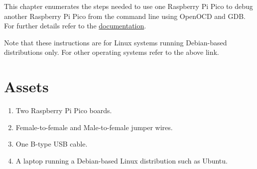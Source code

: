 This chapter enumerates the steps needed to use one Raspberry Pi Pico to debug
another Raspberry Pi Pico from the command line using OpenOCD and GDB. For
further details refer to the
\href{https://www.raspberrypi.com/documentation/microcontrollers/raspberry-pi-pico.html#debugging-using-another-raspberry-pi-pico}{documentation}.

Note that these instructions are for Linux systems running Debian-based
distributions only. For other operating systems refer to the above link.

\section{Assets}
\begin{enumerate}
    \item Two Raspberry Pi Pico boards.
    \item Female-to-female and Male-to-female jumper wires.
    \item One B-type USB cable.
    \item A laptop running a Debian-based Linux distribution such as Ubuntu. 
\end{enumerate}

